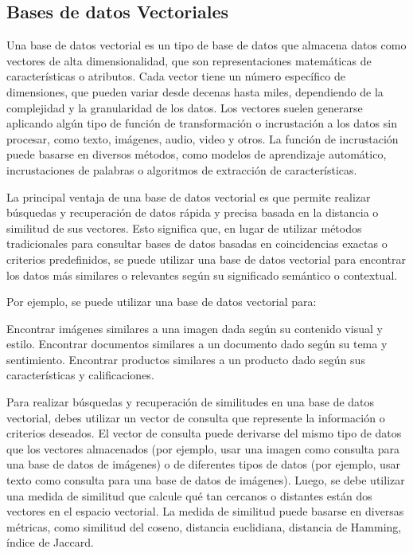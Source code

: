 \subsection{Bases de datos Vectoriales}

Una base de datos vectorial es un tipo de base de datos que almacena datos como vectores de alta dimensionalidad, que son representaciones matemáticas de características o atributos. Cada vector tiene un número específico de dimensiones, que pueden variar desde decenas hasta miles, dependiendo de la complejidad y la granularidad de los datos. Los vectores suelen generarse aplicando algún tipo de función de transformación o incrustación a los datos sin procesar, como texto, imágenes, audio, video y otros. La función de incrustación puede basarse en diversos métodos, como modelos de aprendizaje automático, incrustaciones de palabras o algoritmos de extracción de características\cite{MicrosoftVectorDatabase}.

La principal ventaja de una base de datos vectorial es que permite realizar búsquedas y recuperación de datos rápida y precisa basada en la distancia o similitud de sus vectores. Esto significa que, en lugar de utilizar métodos tradicionales para consultar bases de datos basadas en coincidencias exactas o criterios predefinidos, se puede utilizar una base de datos vectorial para encontrar los datos más similares o relevantes según su significado semántico o contextual.

Por ejemplo, se puede utilizar una base de datos vectorial para:

Encontrar imágenes similares a una imagen dada según su contenido visual y estilo.
Encontrar documentos similares a un documento dado según su tema y sentimiento.
Encontrar productos similares a un producto dado según sus características y calificaciones.

Para realizar búsquedas y recuperación de similitudes en una base de datos vectorial, debes utilizar un vector de consulta que represente la información o criterios deseados. El vector de consulta puede derivarse del mismo tipo de datos que los vectores almacenados (por ejemplo, usar una imagen como consulta para una base de datos de imágenes) o de diferentes tipos de datos (por ejemplo, usar texto como consulta para una base de datos de imágenes). Luego, se debe utilizar una medida de similitud que calcule qué tan cercanos o distantes están dos vectores en el espacio vectorial. La medida de similitud puede basarse en diversas métricas, como similitud del coseno, distancia euclidiana, distancia de Hamming, índice de Jaccard.

